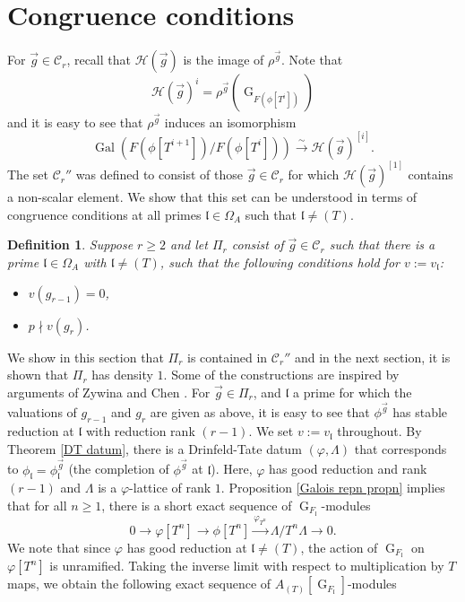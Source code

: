 \documentclass[11pt]{amsart}
\newtheorem{definition}[theorem]{Definition}
\newcommand{\fl}{\mathfrak{l}}
\newcommand{\cH}{\mathcal{H}}
\newcommand{\cC}{\mathcal{C}}
\newcommand{\op}[1]{\operatorname{#1}}
\numberwithin{equation}{section}
\begin{document}
\section{Congruence conditions}
For $\vec{g}\in \cC_r$, recall that $\cH(\vec{g})$ is the image of $\rho^{\vec{g}}$. Note that \[\cH(\vec{g})^i=\rho^{\vec{g}}\left(\op{G}_{F(\phi[T^i])}\right)\] and it is easy to see that $\rho^{\vec{g}}$ induces an isomorphism 
\[\op{Gal}\left(F(\phi[T^{i+1}])/F(\phi[T^i])\right)\xrightarrow{\sim} \cH(\vec{g})^{[i]}.\] 
The set $\cC_r''$ was defined to consist of those $\vec{g}\in \cC_r$ for which $\cH(\vec{g})^{[1]}$ contains a non-scalar element. We show that this set can be understood in terms of congruence conditions at all primes $\fl\in \Omega_A$ such that $\fl\neq (T)$. 
\begin{definition}Suppose $r\geq 2$ and let $\Pi_r$ consist of $\vec{g}\in \cC_r$ such that there is a prime $\fl\in \Omega_A$ with $\fl\neq (T)$, such that the following conditions hold for $v:=v_\fl$: 
\begin{itemize}
    \item $v(g_{r-1})=0$, 
    \item $p\nmid v(g_{r})$.
\end{itemize}
\end{definition}
We show in this section that $\Pi_r$ is contained in $\cC_r''$ and in the next section, it is shown that $\Pi_r$ has density $1$. Some of the constructions are inspired by arguments of Zywina \cite{zywina2011drinfeld} and Chen \cite{Chen2}. For $\vec{g}\in \Pi_r$, and $\fl$ a prime for which the valuations of $g_{r-1}$ and $g_r$ are given as above, it is easy to see that $\phi^{\vec{g}}$ has stable reduction at $\mathfrak{l}$ with reduction rank $(r-1)$. We set $v:=v_{\fl}$ throughout. By Theorem \ref{DT datum}, there is a Drinfeld-Tate datum $(\varphi, \Lambda)$ that corresponds to $\phi_{\mathfrak{l}}=\phi_{\mathfrak{l}}^{\vec{g}}$ (the completion of $\phi^{\vec{g}}$ at $\fl$). Here, $\varphi$ has good reduction and rank $(r-1)$ and $\Lambda$ is a $\varphi$-lattice of rank $1$. Proposition \ref{Galois repn propn} implies that for all $n\geq 1$, there is a short exact sequence of $\op{G}_{F_{\mathfrak{l}}}$-modules
\begin{equation}\label{T^n exact sequence}0\longrightarrow \varphi[T^n]\longrightarrow \phi[T^n] \xrightarrow{\varphi_{T^n}}\Lambda/T^n \Lambda \longrightarrow 0.\end{equation}
We note that since $\varphi$ has good reduction at $\fl\neq (T)$, the action of $\op{G}_{F_{\fl}}$ on $\varphi[T^n]$ is unramified. Taking the inverse limit with respect to multiplication by $T$ maps, we obtain the following exact sequence of $A_{(T)}[\op{G}_{F_{\fl}}]$-modules
\end{document}
